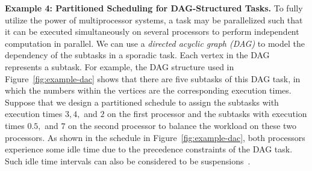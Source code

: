 {\bf Example 4: Partitioned Scheduling for DAG-Structured Tasks.}
 \hspace{0.1in}
To fully utilize the power of multiprocessor systems, a task may be parallelized such that it can be executed simultaneously on several processors to perform independent computation in parallel. We can use a \emph{directed acyclic graph (DAG)} to model the dependency of the subtasks in a sporadic task. Each vertex in the DAG represents a subtask. For example, the DAG structure used in Figure~\ref{fig:example-dac} shows that there are five subtasks of this DAG task, in which the numbers within the vertices are the corresponding execution times. Suppose that we design a partitioned schedule to assign the subtasks with execution times $3,4,$ and $2$ on the first processor and the subtasks with execution times $0.5,$ and $7$ on the second processor to balance the workload on these two processors. As shown in the schedule in Figure~\ref{fig:example-dac}, both processors experience some idle time 
due to the precedence constraints of the DAG task. Such idle time intervals can also be considered to be suspensions~\cite{fonseca2016response}. 




